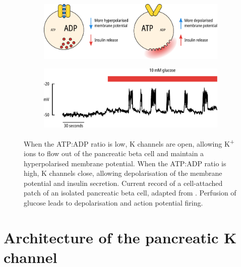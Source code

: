 \begin{figure}[hbtp]
	\centering
	\begin{subfigure}[t]{0.9\textwidth}
		\caption{}\label{ch1fig:beta_cells}
		\centering
		\includegraphics[width=\textwidth]{beta_cells.pdf}
	\end{subfigure}
	\vfill
	\begin{subfigure}[t]{0.9\textwidth}
		\caption{}\label{ch1fig:beta_cells_firing}
		\centering
		\includegraphics[width=\textwidth]{beta_cells_firing.pdf}
	\end{subfigure}
	\caption[Electrical excitability of pancreatic beta cells]{
		{\bf{}}
		 When the ATP:ADP ratio is low, K\ATP{} channels are open, allowing K\textsuperscript{+} ions to flow out of the pancreatic beta cell and maintain a hyperpolarised membrane potential.
		When the ATP:ADP ratio is high, K\ATP{} channels close, allowing depolarisation of the membrane potential and insulin secretion.
		 Current record of a cell-attached patch of an isolated pancreatic beta cell, adapted from \textcite{rorsman_calcium_1986}. 
		Perfusion of glucose leads to depolarisation and action potential firing.
	}
	\label{ch1fig:beta_cells_overview}
\end{figure}

\section{Architecture of the pancreatic K\ATP{} channel}

